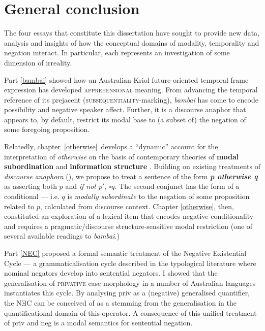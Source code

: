 \documentclass[12pt,dvipsnames]{report}
\begin{document}
%

\chapter*{General conclusion}



The four essays that constitute this dissertation have sought to provide new data, analysis and insights of how the conceptual domains of modality, temporality and negation interact. In particular, each represents an investigation of some dimension of irreality.

Part \ref{bambai} showed how an Australian Kriol future-oriented temporal frame expression has developed \textsc{apprehensional} meaning. From advancing the temporal reference of its prejacent (\textsc{subsequentiality}-marking), \textit{bambai} has come to encode possibility and negative speaker affect. Further, it is a discourse anaphor that appears to, by default, restrict its modal base to (a subset of) the negation of some foregoing proposition.

Relatedly, chapter~\ref{otherwise}~develops a ``dynamic'' account for the interpretation of \textit{otherwise} on the basis of contemporary theories of \textbf{modal subordination} \citep{Roberts1989,Roberts2020,Roberts1995} and \textbf{information structure} \citep[e.g.][]{Roberts2012}. Building on existing treatments of \textit{discourse anaphora} (\citet{Webber2001,Kruijff-Korbayova2001}), we propose to treat a sentence of the form \textbf{\textit{p otherwise q}} as asserting both $ p $ and \textit{if not $ p' $, $ \square q $}. The second conjunct has the form of a conditional --- i.e. $ q $ is \textit{modally subordinate} to the negation of some proposition related to $ p $, calculated from discourse context. Chapter \ref{otherwise}, then, constituted an exploration of a lexical item that encodes negative conditionality and requires a pragmatic/discourse structure-sensitive modal restriction (one of several available readings to \textit{bambai}.)

Part \ref{NEC} proposed a formal semantic treatment of the Negative Existential Cycle --- a grammaticalisation cycle described in the typological literature where nominal negators develop into sentential negators. I showed that the generalisation of \textsc{privative} case morphology in a number of Australian languages instantiates this cycle. By analysing \gls{priv} as a (negative) generalised quantifier, the NƎC can be conceived of as a stemming from the generalisation in the quantificational domain of this operator. A consequence of this unified treatment of \gls{priv} and \gls{neg} is a modal semantics for sentential negation.
\end{document}
